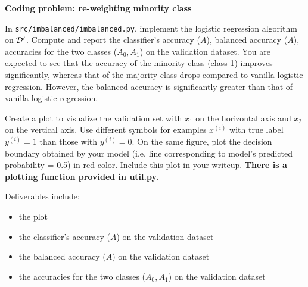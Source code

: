 \item {} \textbf{Coding problem: re-weighting minority class}

In \texttt{src/imbalanced/imbalanced.py}, implement the logistic regression algorithm on $\mathcal{D}'$.  Compute and report the classifier's accuracy ($A$), balanced accuracy ($\overline{A}$), accuracies for the two classes ($A_0, A_1$) on the validation dataset. You are expected to see that the accuracy of the minority class (class 1) improves significantly, whereas that of the majority class drops compared to vanilla logistic regression. However, the balanced accuracy is significantly
greater than that of vanilla logistic regression.


Create a plot to visualize the validation set with $x_1$ on the horizontal axis and $x_2$ on
the vertical axis. Use different symbols for examples $x^{(i)}$ with true label $y^{(i)} = 1$
than those with $y^{(i)} = 0$. On the same figure, plot the decision boundary obtained
by your model (i.e, line corresponding to model's predicted probability = 0.5) in red color. Include
this plot in your writeup. \textbf{There is a plotting function provided in util.py.}

Deliverables include:
\begin{itemize}
    \item the plot
    \item the classifier's accuracy ($A$) on the validation dataset
    \item the balanced accuracy ($\overline{A}$) on the validation dataset
    \item the accuracies for the two classes ($A_0, A_1$) on the validation dataset
\end{itemize}


